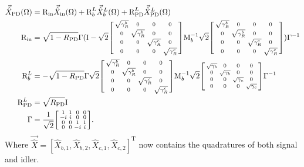 \begin{align}
\vec{\hat X}_\mathrm{PD}(\Omega)&=\text{R}_\text{in}\vec{\hat X}_\mathrm{in}(\Omega)+\text{R}^L_b\vec{\hat X}^L_b(\Omega)+\text{R}^L_\text{PD}\vec{\hat X}^L_\text{PD}(\Omega)\\
\text{R}_\text{in}&=\sqrt{1-R_\text{PD}}\Gamma(\text{I}-\sqrt 2\begin{bsmallmatrix}
\sqrt{\gamma^b_R} & 0 & 0 & 0 \\
0 & \sqrt{\gamma^b_R} & 0 & 0 \\
0 & 0 & \sqrt{\gamma^c_R} & 0 \\
0 & 0 & 0 & \sqrt{\gamma^c_R}
\end{bsmallmatrix}\text{M}_b^{-1}\sqrt{2}\begin{bsmallmatrix}
\sqrt{\gamma^b_R} & 0 & 0 & 0 \\
0 & \sqrt{\gamma^b_R} & 0 & 0 \\
0 & 0 & \sqrt{\gamma^c_R} & 0 \\
0 & 0 & 0 & \sqrt{\gamma^c_R}
\end{bsmallmatrix})\Gamma^{-1}\\
\text{R}^L_b&=-\sqrt{1-R_\text{PD}}\Gamma\sqrt 2\begin{bsmallmatrix}
\sqrt{\gamma^b_R} & 0 & 0 & 0 \\
0 & \sqrt{\gamma^b_R} & 0 & 0 \\
0 & 0 & \sqrt{\gamma^c_R} & 0 \\
0 & 0 & 0 & \sqrt{\gamma^c_R}
\end{bsmallmatrix}\text{M}_b^{-1}\sqrt{2}\begin{bsmallmatrix}
\sqrt{\gamma_b} & 0 & 0 & 0 \\
0 & \sqrt{\gamma_b} & 0 & 0 \\
0 & 0 & \sqrt{\gamma_c} & 0 \\
0 & 0 & 0 & \sqrt{\gamma_c}
\end{bsmallmatrix}\Gamma^{-1}\\
\text{R}^L_\text{PD}&=\sqrt{R_\text{PD}} \text{I}\\
\Gamma&= \frac{1}{\sqrt2}\begin{bsmallmatrix}
1 & 1 & 0 & 0 \\
-i & i & 0 & 0 \\
0 & 0 & 1 & 1 \\
0 & 0 & -i & i
\end{bsmallmatrix}.
\end{align}
Where $\vec{\hat X}=[\hat X_{b,1},\hat X_{b,2},\hat X_{c,1},\hat X_{c,2}]^\text{T}$ now contains the quadratures of both signal and idler.

